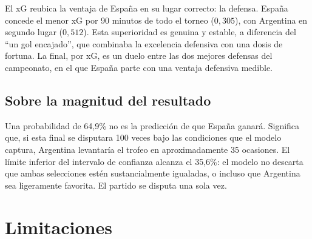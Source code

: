 \documentclass[11pt,a4paper]{article}
\begin{document}
El xG reubica la ventaja de España en su lugar correcto: la defensa. España concede el menor xG por 90 minutos de todo el torneo ($0{,}305$), con Argentina en segundo lugar ($0{,}512$). Esta superioridad es genuina y estable, a diferencia del ``un gol encajado'', que combinaba la excelencia defensiva con una dosis de fortuna. La final, por xG, es un duelo entre las dos mejores defensas del campeonato, en el que España parte con una ventaja defensiva medible.

\subsection{Sobre la magnitud del resultado}

Una probabilidad de 64{,}9\% no es la predicción de que España ganará. Significa que, si esta final se disputara 100 veces bajo las condiciones que el modelo captura, Argentina levantaría el trofeo en aproximadamente 35 ocasiones. El límite inferior del intervalo de confianza alcanza el 35{,}6\%: el modelo no descarta que ambas selecciones estén sustancialmente igualadas, o incluso que Argentina sea ligeramente favorita. El partido se disputa una sola vez.

\section{Limitaciones}
\end{document}
